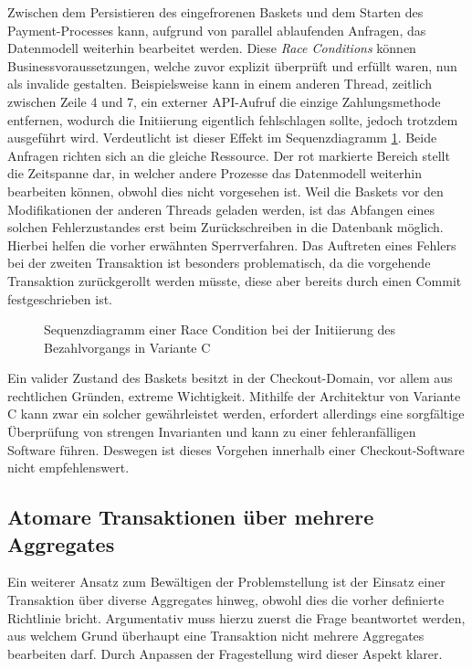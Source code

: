 Zwischen dem Persistieren des eingefrorenen Baskets und dem Starten des Payment-Processes kann, aufgrund von parallel ablaufenden Anfragen, das Datenmodell weiterhin bearbeitet werden. Diese \emph{\Gls{Race Condition}s} können Businessvoraussetzungen, welche zuvor explizit überprüft und erfüllt waren, nun als invalide gestalten. Beispielsweise kann in einem anderen Thread, zeitlich zwischen Zeile 4 und 7, ein externer API-Aufruf die einzige Zahlungsmethode entfernen, wodurch die Initiierung eigentlich fehlschlagen sollte, jedoch trotzdem ausgeführt wird. Verdeutlicht ist dieser Effekt im Sequenzdiagramm \ref{fig:VarC-Sequence-Alt}. Beide Anfragen richten sich an die gleiche Ressource. Der rot markierte Bereich stellt die Zeitspanne dar, in welcher andere Prozesse das Datenmodell weiterhin bearbeiten können, obwohl dies nicht vorgesehen ist. Weil die Baskets vor den Modifikationen der anderen Threads geladen werden, ist das Abfangen eines solchen Fehlerzustandes erst beim Zurückschreiben in die Datenbank möglich. Hierbei helfen die vorher erwähnten Sperrverfahren. Das Auftreten eines Fehlers bei der zweiten Transaktion ist besonders problematisch, da die vorgehende Transaktion zurückgerollt werden müsste, diese aber bereits durch einen Commit festgeschrieben ist. 

\begin{figure}[H]
	\vspace{0.5cm}
	\centering
	
	\caption{Sequenzdiagramm einer Race Condition bei der Initiierung des Bezahlvorgangs in Variante C}
	\label{fig:VarC-Sequence-Alt}
\end{figure}

Ein valider Zustand des Baskets besitzt in der Checkout-Domain, vor allem aus rechtlichen Gründen, extreme Wichtigkeit. Mithilfe der Architektur von Variante C kann zwar ein solcher gewährleistet werden, erfordert allerdings eine sorgfältige Überprüfung von strengen Invarianten und kann zu einer fehleranfälligen Software führen. Deswegen ist dieses Vorgehen innerhalb einer Checkout-Software nicht empfehlenswert. 


\subsection{Atomare Transaktionen über mehrere Aggregates}

Ein weiterer Ansatz zum Bewältigen der Problemstellung ist der Einsatz einer Transaktion über diverse Aggregates hinweg, obwohl dies die vorher definierte Richtlinie bricht. Argumentativ muss hierzu zuerst die Frage beantwortet werden, aus welchem Grund überhaupt eine Transaktion nicht mehrere Aggregates bearbeiten darf. Durch Anpassen der Fragestellung wird dieser Aspekt klarer. 

